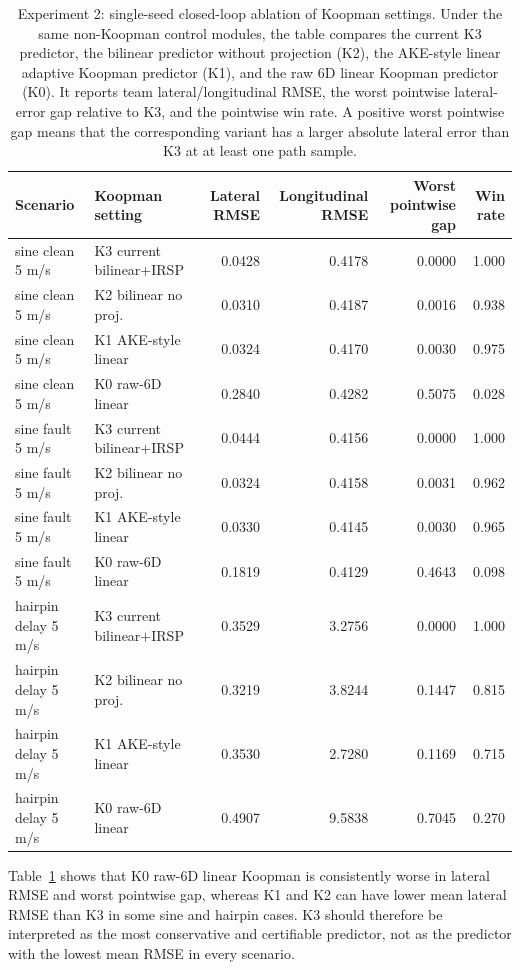 \documentclass[twocolumn,3p,times,procedia]{elsarticle}
\begin{document}
\begin{table}[!tbp]
\centering
\caption{Experiment 2: single-seed closed-loop ablation of Koopman settings. Under the same non-Koopman control modules, the table compares the current K3 predictor, the bilinear predictor without projection (K2), the AKE-style linear adaptive Koopman predictor (K1), and the raw 6D linear Koopman predictor (K0). It reports team lateral/longitudinal RMSE, the worst pointwise lateral-error gap relative to K3, and the pointwise win rate. A positive worst pointwise gap means that the corresponding variant has a larger absolute lateral error than K3 at at least one path sample.}
\label{tab:e9_koopman_dim}
\footnotesize
\begin{tabular}{llrrrr}
\toprule
Scenario & Koopman setting & Lateral RMSE & Longitudinal RMSE & Worst pointwise gap & Win rate\\
\midrule
sine clean 5 m/s & K3 current bilinear+IRSP & 0.0428 & 0.4178 & 0.0000 & 1.000\\
sine clean 5 m/s & K2 bilinear no proj. & 0.0310 & 0.4187 & 0.0016 & 0.938\\
sine clean 5 m/s & K1 AKE-style linear & 0.0324 & 0.4170 & 0.0030 & 0.975\\
sine clean 5 m/s & K0 raw-6D linear & 0.2840 & 0.4282 & 0.5075 & 0.028\\
sine fault 5 m/s & K3 current bilinear+IRSP & 0.0444 & 0.4156 & 0.0000 & 1.000\\
sine fault 5 m/s & K2 bilinear no proj. & 0.0324 & 0.4158 & 0.0031 & 0.962\\
sine fault 5 m/s & K1 AKE-style linear & 0.0330 & 0.4145 & 0.0030 & 0.965\\
sine fault 5 m/s & K0 raw-6D linear & 0.1819 & 0.4129 & 0.4643 & 0.098\\
hairpin delay 5 m/s & K3 current bilinear+IRSP & 0.3529 & 3.2756 & 0.0000 & 1.000\\
hairpin delay 5 m/s & K2 bilinear no proj. & 0.3219 & 3.8244 & 0.1447 & 0.815\\
hairpin delay 5 m/s & K1 AKE-style linear & 0.3530 & 2.7280 & 0.1169 & 0.715\\
hairpin delay 5 m/s & K0 raw-6D linear & 0.4907 & 9.5838 & 0.7045 & 0.270\\
\bottomrule
\end{tabular}
\end{table}

Table~\ref{tab:e9_koopman_dim} shows that K0 raw-6D linear Koopman is consistently worse in lateral RMSE and worst pointwise gap, whereas K1 and K2 can have lower mean lateral RMSE than K3 in some sine and hairpin cases. K3 should therefore be interpreted as the most conservative and certifiable predictor, not as the predictor with the lowest mean RMSE in every scenario.
\end{document}
